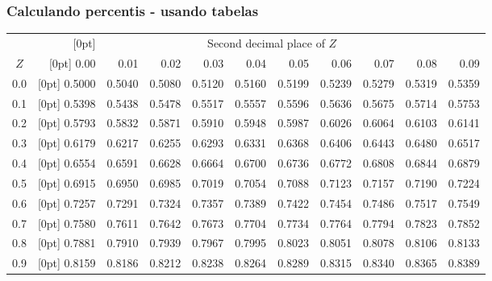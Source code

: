 \begin{frame}[fragile]
\frametitle{Calculando percentis - usando tabelas}

{\footnotesize
\begin{tabular}{c | >{\columncolor[gray]{0.6}[0pt]}rrrrr | rrrrr |}
  \cline{2-11}
&&&& \multicolumn{4}{c}{Second decimal place of $Z$} &&& \\
  \cline{2-11}
$Z$ & 0.00 & 0.01 & 0.02 & 0.03 & 0.04 & 0.05 & 0.06 & 0.07 & 0.08 & 0.09 \\
  \hline
  \hline
0.0 & \tiny{0.5000} & \tiny{0.5040} & \tiny{0.5080} & \tiny{0.5120} & \tiny{0.5160} & \tiny{0.5199} & \tiny{0.5239} & \tiny{0.5279} & \tiny{0.5319} & \tiny{0.5359} \\
  0.1 & \tiny{0.5398} & \tiny{0.5438} & \tiny{0.5478} & \tiny{0.5517} & \tiny{0.5557} & \tiny{0.5596} & \tiny{0.5636} & \tiny{0.5675} & \tiny{0.5714} & \tiny{0.5753} \\
  0.2 & \tiny{0.5793} & \tiny{0.5832} & \tiny{0.5871} & \tiny{0.5910} & \tiny{0.5948} & \tiny{0.5987} & \tiny{0.6026} & \tiny{0.6064} & \tiny{0.6103} & \tiny{0.6141} \\
  0.3 & \tiny{0.6179} & \tiny{0.6217} & \tiny{0.6255} & \tiny{0.6293} & \tiny{0.6331} & \tiny{0.6368} & \tiny{0.6406} & \tiny{0.6443} & \tiny{0.6480} & \tiny{0.6517} \\
  0.4 & \tiny{0.6554} & \tiny{0.6591} & \tiny{0.6628} & \tiny{0.6664} & \tiny{0.6700} & \tiny{0.6736} & \tiny{0.6772} & \tiny{0.6808} & \tiny{0.6844} & \tiny{0.6879} \\
  \hline
  0.5 & \tiny{0.6915} & \tiny{0.6950} & \tiny{0.6985} & \tiny{0.7019} & \tiny{0.7054} & \tiny{0.7088} & \tiny{0.7123} & \tiny{0.7157} & \tiny{0.7190} & \tiny{0.7224} \\
  0.6 & \tiny{0.7257} & \tiny{0.7291} & \tiny{0.7324} & \tiny{0.7357} & \tiny{0.7389} & \tiny{0.7422} & \tiny{0.7454} & \tiny{0.7486} & \tiny{0.7517} & \tiny{0.7549} \\
  0.7 & \tiny{0.7580} & \tiny{0.7611} & \tiny{0.7642} & \tiny{0.7673} & \tiny{0.7704} & \tiny{0.7734} & \tiny{0.7764} & \tiny{0.7794} & \tiny{0.7823} & \tiny{0.7852} \\
  0.8 & \tiny{0.7881} & \tiny{0.7910} & \tiny{0.7939} & \tiny{0.7967} & \tiny{0.7995} & \tiny{0.8023} & \tiny{0.8051} & \tiny{0.8078} & \tiny{0.8106} & \tiny{0.8133} \\
  0.9 & \tiny{0.8159} & \tiny{0.8186} & \tiny{0.8212} & \tiny{0.8238} & \tiny{0.8264} & \tiny{0.8289} & \tiny{0.8315} & \tiny{0.8340} & \tiny{0.8365} & \tiny{0.8389} \\

\end{tabular}}
\end{frame}
